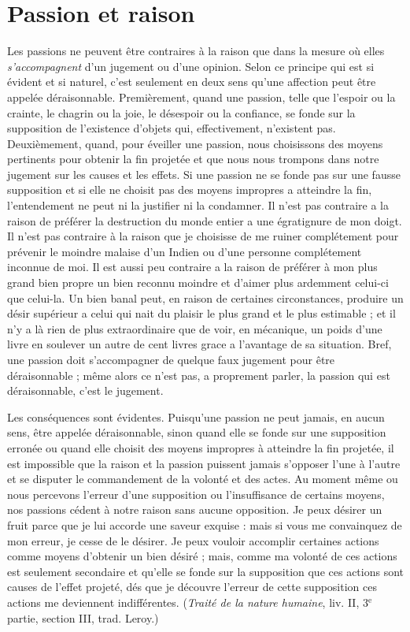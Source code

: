 
\section{Passion et raison}
Les passions ne peuvent être contraires à la raison que
dans la mesure où elles {\it s’accompagnent} d’un jugement ou
d’une opinion. Selon ce principe qui est si évident et si
naturel, c’est seulement en deux sens qu’une affection
peut être appelée déraisonnable. Premièrement, quand
une passion, telle que l’espoir ou la crainte, le chagrin ou
la joie, le désespoir ou la confiance, se fonde sur la supposition
de l’existence d’objets qui, effectivement, n’existent
pas. Deuxièmement, quand, pour éveiller une passion,
nous choisissons des moyens pertinents pour obtenir la
fin projetée et que nous nous trompons dans notre jugement
sur les causes et les effets. Si une passion ne se fonde
pas sur une fausse supposition et si elle ne choisit pas des
moyens impropres a atteindre la fin, l’entendement ne
peut ni la justifier ni la condamner. Il n’est pas contraire
a la raison de préférer la destruction du monde entier a
une égratignure de mon doigt. Il n’est pas contraire à la
raison que je choisisse de me ruiner complétement pour
prévenir le moindre malaise d’un Indien ou d’une personne
complétement inconnue de moi. Il est aussi peu contraire
a la raison de préférer à mon plus grand bien propre un
bien reconnu moindre et d’aimer plus ardemment celui-ci
que celui-la. Un bien banal peut, en raison de certaines
circonstances, produire un désir supérieur a celui qui nait
du plaisir le plus grand et le plus estimable ; et il n’y a là
rien de plus extraordinaire que de voir, en mécanique,
un poids d’une livre en soulever un autre de cent livres
grace a l’avantage de sa situation. Bref, une passion doit
s’accompagner de quelque faux jugement pour être déraisonnable ;
même alors ce n’est pas, a proprement parler,
la passion qui est déraisonnable, c’est le jugement.

Les conséquences sont évidentes. Puisqu’une passion ne
peut jamais, en aucun sens, être appelée déraisonnable,
sinon quand elle se fonde sur une supposition erronée ou
quand elle choisit des moyens impropres à atteindre la
fin projetée, il est impossible que la raison et la passion
puissent jamais s’opposer l’une à l’autre et se disputer le
commandement de la volonté et des actes. Au moment
même ou nous percevons l’erreur d’une supposition ou
l'insuffisance de certains moyens, nos passions cédent à
notre raison sans aucune opposition. Je peux désirer un
fruit parce que je lui accorde une saveur exquise : mais si
vous me convainquez de mon erreur, je cesse de le désirer.
Je peux vouloir accomplir certaines actions comme moyens
d’obtenir un bien désiré ; mais, comme ma volonté de ces
actions est seulement secondaire et qu’elle se fonde sur la
supposition que ces actions sont causes de l'effet projeté,
dés que je découvre l’erreur de cette supposition ces
actions me deviennent indifférentes. ({\it Traité de la nature
humaine}, liv. II, 3$^\text{e}$ partie, section III, trad. Leroy.)

